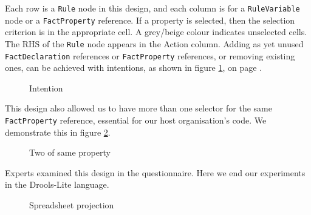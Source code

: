Each row is a \texttt{Rule} node in this design, and each column is for a \texttt{RuleVariable} node or a \texttt{FactProperty} reference.
If a property is selected, then the selection criterion is in the appropriate cell.
A grey/beige colour indicates unselected cells.
The RHS of the \texttt{Rule} node appears in the Action column.
Adding as yet unused \texttt{FactDeclaration} references or \texttt{FactProperty} references, or removing existing ones, can be achieved with intentions, as shown in figure \ref{fig:SpreadsheetIntentions}, on page \pageref{fig:SpreadsheetIntentions}.

\begin{figure}[h]
    \centering
    \caption{Intention}
    \label{fig:SpreadsheetIntentions}
\end{figure}

This design also allowed us to have more than one selector for the same \texttt{FactProperty} reference, essential for our host organisation's code.
We demonstrate this in figure \ref{fig:TwoProperties}.

\begin{figure}[h]
    \centering
    \caption{Two of same property}
    \label{fig:TwoProperties}
\end{figure}

Experts examined this design in the questionnaire. 
Here we end our experiments in the Drools-Lite language.

\begin{figure}
    \centering
    \caption{Spreadsheet projection}
    \label{fig:SpreadsheetProjection}
\end{figure}

